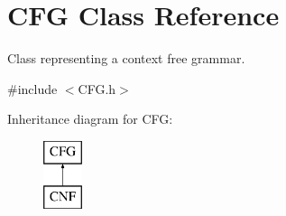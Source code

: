 \hypertarget{class_c_f_g}{\section{C\-F\-G Class Reference}
\label{class_c_f_g}
}


Class representing a context free grammar.  




{\ttfamily \#include $<$C\-F\-G.\-h$>$}

Inheritance diagram for C\-F\-G\-:\begin{figure}[H]
\begin{center}
\leavevmode
\includegraphics[height=2.000000cm]{class_c_f_g}
\end{center}
\end{figure}
